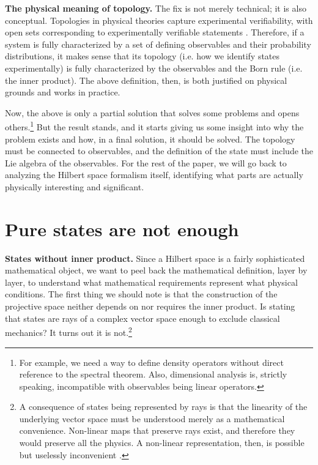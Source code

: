 \documentclass[entropy,article,submit,moreauthors]{Definitions/mdpi}
\begin{document}
\textbf{The physical meaning of topology.} The fix is not merely technical; it is also conceptual. Topologies in physical theories capture experimental verifiability, with open sets corresponding to experimentally verifiable statements \cite{aop-book,aop-math-topologydistinguishability,Kelly1996,GeninKelly2017,Vickers1989}. Therefore, if a system is fully characterized by a set of defining observables and their probability distributions, it makes sense that its topology (i.e. how we identify states experimentally) is fully characterized by the observables and the Born rule (i.e. the inner product). The above definition, then, is both justified on physical grounds and works in practice.

Now, the above is only a partial solution that solves some problems and opens others.\footnote{For example, we need a way to define density operators without direct reference to the spectral theorem. Also, dimensional analysis is, strictly speaking, incompatible with observables being linear operators.} But the result stands, and it starts giving us some insight into why the problem exists and how, in a final solution, it should be solved. The topology must be connected to observables, and the definition of the state must include the Lie algebra of the observables. For the rest of the paper, we will go back to analyzing the Hilbert space formalism itself, identifying what parts are actually physically interesting and significant.

\section{Pure states are not enough}

\textbf{States without inner product.} Since a Hilbert space is a fairly sophisticated mathematical object, we want to peel back the mathematical definition, layer by layer, to understand what mathematical requirements represent what physical conditions. The first thing we should note is that the construction of the projective space neither depends on nor requires the inner product. Is stating that states are rays of a complex vector space enough to exclude classical mechanics? It turns out it is not.\footnote{A consequence of states being represented by rays is that the linearity of the underlying vector space must be understood merely as a mathematical convenience. Non-linear maps that preserve rays exist, and therefore they would preserve all the physics. A non-linear representation, then, is possible but uselessly inconvenient \cite{Carcassi2026Nonlinear}.}
\end{document}
